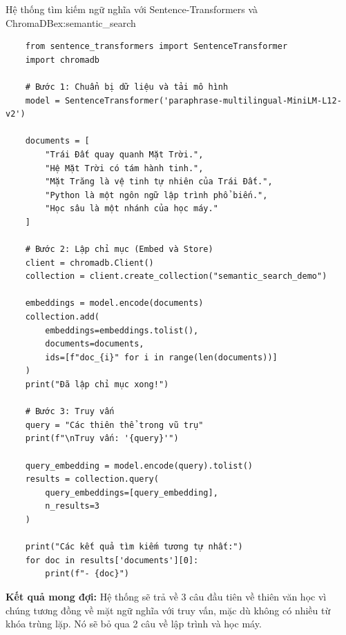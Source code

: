 \begin{example}{Hệ thống tìm kiếm ngữ nghĩa với Sentence-Transformers và ChromaDB}{ex:semantic_search}
    \begin{verbatim}
    from sentence_transformers import SentenceTransformer
    import chromadb
    
    # Bước 1: Chuẩn bị dữ liệu và tải mô hình
    model = SentenceTransformer('paraphrase-multilingual-MiniLM-L12-v2') 
    
    documents = [
        "Trái Đất quay quanh Mặt Trời.",
        "Hệ Mặt Trời có tám hành tinh.",
        "Mặt Trăng là vệ tinh tự nhiên của Trái Đất.",
        "Python là một ngôn ngữ lập trình phổ biến.",
        "Học sâu là một nhánh của học máy."
    ]
    
    # Bước 2: Lập chỉ mục (Embed và Store)
    client = chromadb.Client()
    collection = client.create_collection("semantic_search_demo")
    
    embeddings = model.encode(documents)
    collection.add(
        embeddings=embeddings.tolist(),
        documents=documents,
        ids=[f"doc_{i}" for i in range(len(documents))]
    )
    print("Đã lập chỉ mục xong!")
    
    # Bước 3: Truy vấn
    query = "Các thiên thể trong vũ trụ"
    print(f"\nTruy vấn: '{query}'")
    
    query_embedding = model.encode(query).tolist()
    results = collection.query(
        query_embeddings=[query_embedding],
        n_results=3
    )
    
    print("Các kết quả tìm kiếm tương tự nhất:")
    for doc in results['documents'][0]:
        print(f"- {doc}")
    \end{verbatim}
\end{example}

\textbf{Kết quả mong đợi:} Hệ thống sẽ trả về 3 câu đầu tiên về thiên văn học vì chúng tương đồng về mặt ngữ nghĩa với truy vấn, mặc dù không có nhiều từ khóa trùng lặp. Nó sẽ bỏ qua 2 câu về lập trình và học máy.
